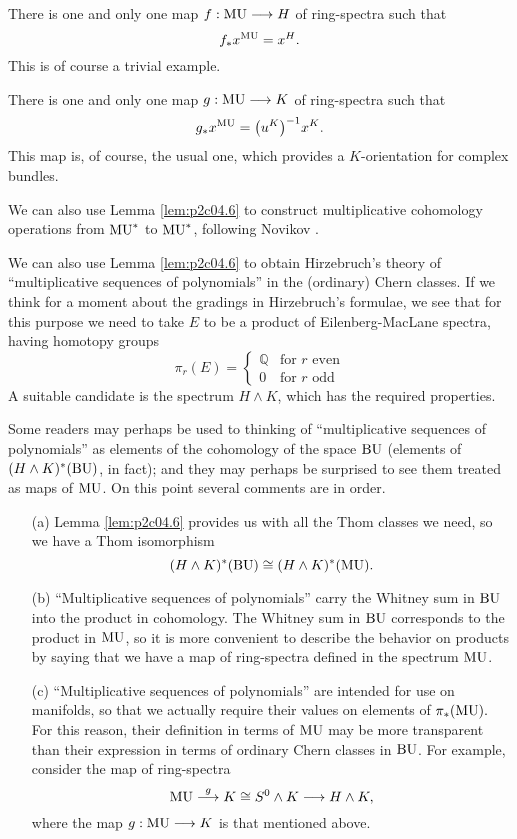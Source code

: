 \documentclass[../main]{subfiles}
\begin{document}
\begin{customexample}{4.7}
There is one and only one map $f:\mathrm{MU}\longrightarrow H$ of ring-spectra such that \[f_\ast x^{\mathrm{MU}}=x^H.\] This is of course a trivial example.
\end{customexample}

\begin{customexample}{4.8}
There is one and only one map $g:\mathrm{MU}\longrightarrow K$ of ring-spectra such that \[g_\ast x^{\mathrm{MU}}=\big(u^K\big)^{-1}x^K.\] This map is, of course, the usual one, which provides a $K$-orientation for complex bundles.
\end{customexample}

We can also use Lemma \ref{lem:p2c04.6} to construct multiplicative cohomology operations from $\mathrm{MU}^\ast$ to $\mathrm{MU}^\ast$, following Novikov \cite{novikov}.

We can also use Lemma \ref{lem:p2c04.6} to obtain Hirzebruch's theory of ``multiplicative sequences of polynomials'' in the (ordinary) Chern classes. If we think for a moment about the gradings in Hirzebruch's formulae, we see that for this purpose we need to take $E$ to be a product of Eilenberg-MacLane spectra, having homotopy groups
\[\pi_r(E)=\begin{cases}\mathbb{Q} & \text{for } r \text{ even} \\ 0 & \text{for } r \text{ odd}\end{cases}\]
A suitable candidate is the spectrum $H\wedge K$, which has the required properties.

Some readers may perhaps be used to thinking of ``multiplicative sequences of polynomials'' as elements of the cohomology of the space $\mathrm{BU}$ (elements of $(H\wedge K)^\ast(\mathrm{BU})$, in fact); and they may perhaps be surprised to see them treated as maps of $\mathrm{MU}$. On this point several comments are in order.
\begin{enumerate}
    \item[(a)] Lemma \ref{lem:p2c04.6} provides us with all the Thom classes we need, so we have a Thom isomorphism
    \[(H\wedge K)^\ast(\mathrm{BU})\cong(H\wedge K)^\ast(\mathrm{MU}).\]
    \item[(b)] ``Multiplicative sequences of polynomials'' carry the Whitney sum in $\mathrm{BU}$ into the product in cohomology. The Whitney sum in $\mathrm{BU}$ corresponds to the product in $\mathrm{MU}$, so it is more convenient to describe the behavior on products by saying that we have a map of ring-spectra defined in the spectrum $\mathrm{MU}$.
    \item[(c)] ``Multiplicative sequences of polynomials'' are intended for use on manifolds, so that we actually require their values on elements of $\pi_\ast(\mathrm{MU}).$ For this reason, their definition in terms of $\mathrm{MU}$ may be more transparent than their expression in terms of ordinary Chern classes in $\mathrm{BU}$. For example, consider the map of ring-spectra
    \[\mathrm{MU}\overset{g}{\longrightarrow} K\cong S^0\wedge K \longrightarrow H\wedge K,\]
    where the map $g:\mathrm{MU}\longrightarrow K$ is that mentioned above.
\end{enumerate}
\end{document}
